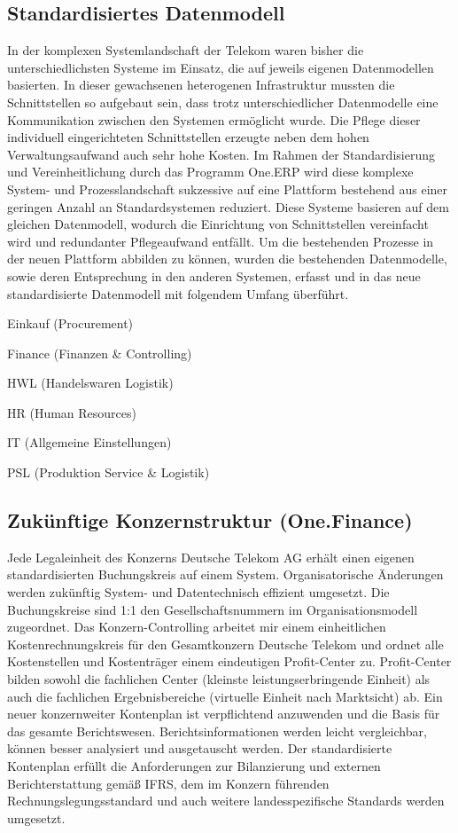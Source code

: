 \subsection{Standardisiertes Datenmodell}
In der komplexen Systemlandschaft der Telekom waren bisher die unterschiedlichsten Systeme im Einsatz, die auf jeweils eigenen Datenmodellen basierten. 
In dieser gewachsenen heterogenen Infrastruktur mussten die Schnittstellen so aufgebaut sein, dass trotz unterschiedlicher Datenmodelle eine Kommunikation zwischen den Systemen ermöglicht wurde. Die Pflege dieser individuell eingerichteten Schnittstellen erzeugte neben dem hohen Verwaltungsaufwand auch sehr hohe Kosten.
Im Rahmen der Standardisierung und Vereinheitlichung durch das Programm One.ERP wird diese komplexe System- und Prozesslandschaft sukzessive auf eine Plattform bestehend aus einer geringen Anzahl an Standardsystemen reduziert. Diese Systeme basieren auf dem gleichen Datenmodell, wodurch die Einrichtung von Schnittstellen vereinfacht wird und redundanter Pflegeaufwand entfällt.
Um die bestehenden Prozesse in der neuen Plattform abbilden zu können, wurden die bestehenden Datenmodelle, sowie deren Entsprechung in den anderen Systemen, erfasst und in das neue standardisierte Datenmodell mit folgendem Umfang überführt.
\begin{compactitem}    
\item    Einkauf (Procurement)
\item    Finance (Finanzen \& Controlling)
\item    HWL (Handelswaren Logistik)
\item    HR (Human Resources)
\item    IT (Allgemeine Einstellungen)
\item    PSL (Produktion Service \& Logistik)
\end{compactitem}

\subsection{Zukünftige Konzernstruktur (One.Finance)}
Jede Legaleinheit des Konzerns Deutsche Telekom AG erhält einen eigenen standardisierten Buchungskreis auf einem System. Organisatorische Änderungen werden zukünftig System- und Datentechnisch effizient umgesetzt. Die Buchungskreise sind 1:1 den Gesellschaftsnummern im Organisationsmodell zugeordnet.
Das Konzern-Controlling arbeitet mir einem einheitlichen Kostenrechnungskreis für den Gesamtkonzern Deutsche Telekom und ordnet alle Kostenstellen und Kostenträger einem eindeutigen Profit-Center zu. Profit-Center bilden sowohl die fachlichen Center (kleinste leistungserbringende Einheit) als auch die fachlichen Ergebnisbereiche (virtuelle Einheit nach Marktsicht) ab.
Ein neuer konzernweiter Kontenplan ist verpflichtend anzuwenden und die Basis für das gesamte Berichtswesen. Berichtsinformationen werden leicht vergleichbar, können besser analysiert und ausgetauscht werden.
Der standardisierte Kontenplan erfüllt die Anforderungen zur Bilanzierung und externen Berichterstattung gemäß IFRS, dem im Konzern führenden Rechnungslegungsstandard und auch weitere landesspezifische Standards werden umgesetzt.


